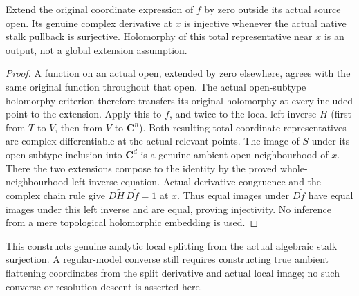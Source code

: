 \begin{theorem}
\label{hir:actual-holomorphic-stalk-surjection-injective-derivative}
\leanok
Extend the original coordinate expression of $f$ by zero outside its actual
source open. Its genuine complex derivative at $x$ is injective whenever
the actual native stalk pullback is surjective. Holomorphy of this total
representative near $x$ is an output, not a global extension assumption.
\end{theorem}
\begin{proof}
A function on an actual open, extended by zero elsewhere, agrees with the
same original function throughout that open. The actual open-subtype
holomorphy criterion therefore transfers its original holomorphy at every
included point to the extension. Apply this to $f$, and twice to the local
left inverse $H$ (first from $T$ to $V$, then from $V$ to $\mathbf C^n$).
Both resulting total coordinate representatives are complex differentiable
at the actual relevant points. The image of $S$ under its open subtype
inclusion into $\mathbf C^d$ is a genuine ambient open neighbourhood of
$x$. There the two extensions compose to the identity by the proved
whole-neighbourhood left-inverse equation. Actual derivative congruence
and the complex chain rule give $D\widetilde H\,D\widetilde f=1$ at $x$.
Thus equal images under $D\widetilde f$ have equal images under this left
inverse and are equal, proving injectivity. No inference from a mere
topological holomorphic embedding is used.
\end{proof}

This constructs genuine analytic local splitting from the actual algebraic
stalk surjection. A regular-model converse still requires constructing true
ambient flattening coordinates from the split derivative and actual local
image; no such converse or resolution descent is asserted here.
